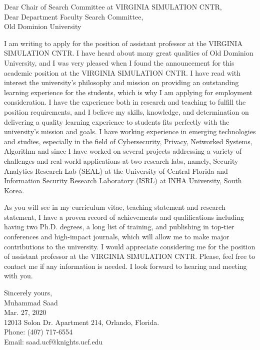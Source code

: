 \documentclass[11pt,letter]{article}
\newcommand{\univ}{Old Dominion University}
\newcommand{\dept}{VIRGINIA SIMULATION CNTR}
\begin{document}
\thispagestyle{empty}
\noindent Dear Chair of Search Committee at \dept,\\
Dear Department Faculty Search Committee,\\
\univ\\
\vspace{10mm}

I am writing to apply for the position of assistant professor at the \dept. 
I have heard about many great qualities of \univ, and I was very pleased when I found the announcement for this academic position at the \dept.  
I have read with interest the university’s philosophy and mission on providing an outstanding learning experience for the students, which is why I am applying for employment consideration.  
I have the experience both in research and teaching to fulfill the position requirements, and I believe my skills, knowledge, and determination on delivering a quality learning experience to students fits perfectly with the university’s mission and goals. 
I have working experience in emerging technologies and studies, especially in the field of Cybersecurity, Privacy, Networked Systems, Algorithm and since I have worked on several projects addressing a variety of challenges and real-world applications at two research labs, namely, Security Analytics Research Lab (SEAL) at the University of Central Florida and Information Security Research Laboratory (ISRL) at INHA University, South Korea.

As you will see in my curriculum vitae, teaching statement and research statement, I have a proven record of achievements and qualifications including having two Ph.D. degrees, a long list of training, and publishing in top-tier conferences and high-impact journals, which will allow me to make major contributions to the university. I would appreciate considering me for the position of assistant professor at the \dept. Please, feel free to contact me if any information is needed. I look forward to hearing and meeting with you.

\vspace{10mm}

\noindent
Sincerely yours,\\
Muhammad Saad\\
Mar. 27, 2020\\
12013 Solon Dr. Apartment 214, Orlando, Florida.\\
Phone: (407) 717-6554\\
Email: saad.ucf@knights.ucf.edu\\
\end{document}
